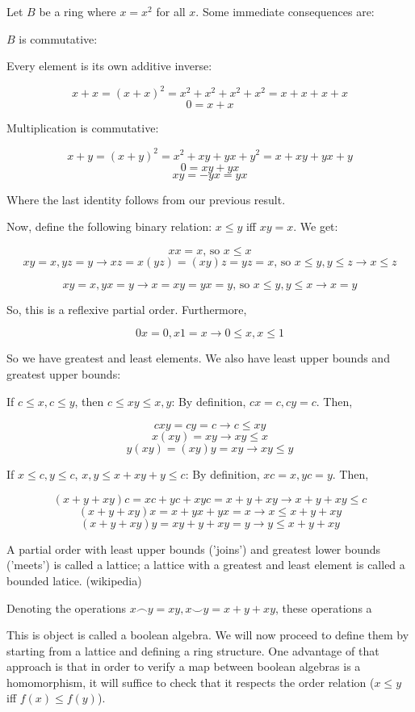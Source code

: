 \documentclass{article}
\title{}
\author{}
\date{}
\begin{document}
  \maketitle
  \section{}

    Let $B$ be a ring where $x = x^2$ for all $x$. Some immediate consequences
    are:

    $B$ is commutative:

    Every element is its own additive inverse:

    \[ x + x = (x + x)^2 = x^2 + x^2 + x^2 + x^2 = x + x + x + x\]
    \[0 = x + x\]

    Multiplication is commutative:

    \[ x + y = (x + y)^2 = x^2 + xy + yx + y^2 = x + xy + yx + y\]
    \[0 = xy + yx\]
    \[xy = -yx = yx\]

    Where the last identity follows from our previous result.

    Now, define the following binary relation: $x \leq y$ iff $xy = x$. We get:

    \[xx = x \text{, so } x \leq x\]
    \[xy = x, yz = y \rightarrow xz = x(yz) = (xy)z = yz = x \text{, so } x
    \leq y, y \leq z \rightarrow x \leq z\]

    \[xy = x, yx = y \rightarrow x = xy = yx = y \text{, so } x \leq y, y \leq
    x \rightarrow x = y\]

    So, this is a reflexive partial order. Furthermore,

    \[0x = 0, x1 = x \rightarrow 0 \leq x, x \leq 1\]

    So we have greatest and least elements. We also have least upper bounds and
    greatest upper bounds:

    If $c \leq x, c \leq y$, then $c \leq xy \leq x, y$: By definition,
    $cx = c, cy = c$. Then,

    \[ cxy = cy = c \rightarrow c \leq xy\]
    \[ x(xy) = xy \rightarrow xy \leq x\]
    \[ y(xy) = (xy)y = xy \rightarrow xy \leq y\]


    If $x \leq c, y \leq c$, $x, y \leq x + xy + y \leq c$: By definition,
    $xc = x, yc = y$. Then,

    \[(x + y + xy)c = xc + yc + xyc = x + y + xy \rightarrow x + y + xy \leq c\]
    \[(x + y + xy)x = x + yx + yx = x \rightarrow x \leq x + y + xy\]
    \[(x + y + xy)y = xy + y + xy = y \rightarrow y \leq x + y + xy\]

    A partial order with least upper bounds ('joins') and greatest lower bounds
    ('meets') is called a lattice; a lattice with a greatest and least element
    is called a bounded latice. (wikipedia)

    Denoting the operations $x \frown y = xy, x \smile y = x + y + xy$, these
    operations a

    This is object is called a boolean algebra. We will now proceed to define
    them by starting from a lattice and defining a ring structure. One advantage
    of that approach is that in order to verify a map between boolean algebras
    is a homomorphism, it will suffice to check that it respects the order
    relation ($x \leq y$ iff $f(x) \leq f(y)$).
\end{document}
